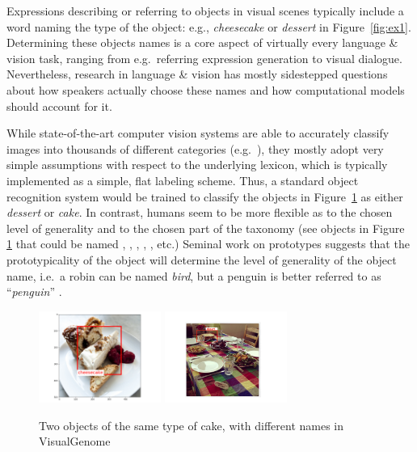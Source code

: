 Expressions describing or referring to objects in visual scenes typically include a word naming the type of the object: e.g.,  \emph{cheesecake} or  \emph{dessert}  in Figure~\ref{fig:ex1}. 
Determining these objects names is a core aspect of virtually every language \& vision task, ranging from e.g.\ referring expression generation to visual dialogue.
Nevertheless, research in language \& vision has mostly  sidestepped questions about how speakers actually choose these names and how computational models should account for it.



While state-of-the-art computer vision systems are able to accurately classify images into thousands of different categories (e.g.\  ), they mostly adopt very simple assumptions with respect to the underlying lexicon, which is typically implemented as a simple, flat labeling scheme. Thus, a standard object recognition system would be trained to classify the objects in Figure~\ref{fig:cake} as either  \emph{dessert} or \emph{cake}.
In contrast, humans seem to be more flexible as to the chosen level of generality and to the chosen part of the taxonomy (see objects in Figure \ref{fig:cake} that could be named , , , , ,  etc.) 
Seminal work on prototypes suggests that the prototypicality of the object will determine the level of generality of the object name, i.e.\  a robin can be named \emph{bird}, but a penguin is better referred to as ``\emph{penguin}'' \cite{Rosch1978}.


\begin{figure}[htbp]
\begin{center}
\includegraphics[height=3cm]{figures/cheesecake.png}
\includegraphics[height=3cm]{figures/cheesecak2.pdf}
\caption{Two objects of the same type of cake, with different names in VisualGenome}
\label{fig:cake}
\end{center}
\end{figure}

